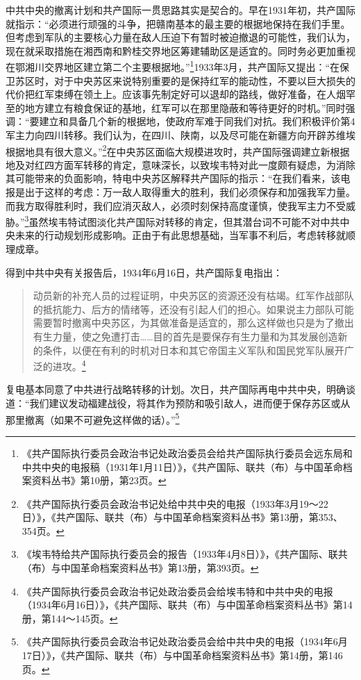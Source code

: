 中共中央的撤离计划和共产国际一贯思路其实是契合的。早在1931年初，共产国际就指示：“必须进行顽强的斗争，把赣南基本的最主要的根据地保持在我们手里。但考虑到军队的主要核心力量在敌人压迫下有暂时被迫撤退的可能性，我们认为，现在就采取措施在湘西南和黔桂交界地区筹建辅助区是适宜的。同时务必更加重视在鄂湘川交界地区建立第二个主要根据地。”\footnote{《共产国际执行委员会政治书记处政治委员会给共产国际执行委员会远东局和中共中央的电报稿（1931年1月11日）》，《共产国际、联共（布）与中国革命档案资料丛书》第10册，第23页。}1933年3月，共产国际又提出：“在保卫苏区时，对于中央苏区来说特别重要的是保持红军的能动性，不要以巨大损失的代价把红军束缚在领土上。应该事先制定好可以退却的路线，做好准备，在人烟罕至的地方建立有粮食保证的基地，红军可以在那里隐蔽和等待更好的时机。”同时强调：“要建立和具备几个新的根据地，使政府军难于同我们对抗。我们积极评价第4军主力向四川转移。我们认为，在四川、陕南，以及尽可能在新疆方向开辟苏维埃根据地具有很大意义。”\footnote{《共产国际执行委员会政治书记处给中共中央的电报（1933年3月19～22日）》，《共产国际、联共（布）与中国革命档案资料丛书》第13册，第353、354页。}在中央苏区面临大规模进攻时，共产国际强调建立新根据地及对红四方面军转移的肯定，意味深长，以致埃韦特对此一度颇有疑虑，为消除其可能带来的负面影响，特电中央苏区解释共产国际的指示：“在我们看来，该电报是出于这样的考虑：万一敌人取得重大的胜利，我们必须保存和加强我军力量。而我方取得胜利时，我们应消灭敌人，必须时刻保持高度谨慎，使我军主力不受威胁。”\footnote{《埃韦特给共产国际执行委员会的报告（1933年4月8日）》，《共产国际、联共（布）与中国革命档案资料丛书》第13册，第393页。}虽然埃韦特试图淡化共产国际对转移的肯定，但其潜台词不可能不对中共中央未来的行动规划形成影响。正由于有此思想基础，当军事不利后，考虑转移就顺理成章。


得到中共中央有关报告后，1934年6月16日，共产国际复电指出：

\begin{quote}

动员新的补充人员的过程证明，中央苏区的资源还没有枯竭。红军作战部队的抵抗能力、后方的情绪等，还没有引起人们的担心。如果说主力部队可能需要暂时撤离中央苏区，为其做准备是适宜的，那么这样做也只是为了撤出有生力量，使之免遭打击……目的首先是要保存有生力量和为其发展创造新的条件，以便在有利的时机对日本和其它帝国主义军队和国民党军队展开广泛的进攻。\footnote{《共产国际执行委员会政治书记处政治委员会给埃韦特和中共中央的电报（1934年6月16日）》，《共产国际、联共（布）与中国革命档案资料丛书》第14册，第144～145页。}
\end{quote}


复电基本同意了中共进行战略转移的计划。次日，共产国际再电中共中央，明确谈道：“我们建议发动福建战役，将其作为预防和吸引敌人，进而便于保存苏区或从那里撤离（如果不可避免这样做的话）。”\footnote{《共产国际执行委员会政治书记处政治委员会给中共中央的电报（1934年6月17日）》，《共产国际、联共（布）与中国革命档案资料丛书》第14册，第146页。}


